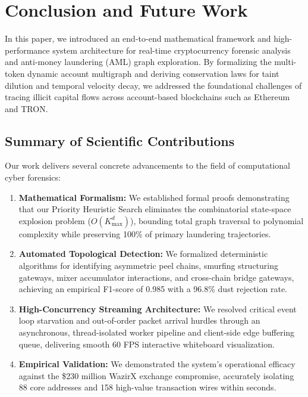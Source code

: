 \section{Conclusion and Future Work}
\label{sec:conclusion}

In this paper, we introduced an end-to-end mathematical framework and high-performance system architecture for real-time cryptocurrency forensic analysis and anti-money laundering (AML) graph exploration. By formalizing the multi-token dynamic account multigraph and deriving conservation laws for taint dilution and temporal velocity decay, we addressed the foundational challenges of tracing illicit capital flows across account-based blockchains such as Ethereum and TRON.

\subsection{Summary of Scientific Contributions}

Our work delivers several concrete advancements to the field of computational cyber forensics:

\begin{enumerate}
    \item \textbf{Mathematical Formalism:} We established formal proofs demonstrating that our Priority Heuristic Search eliminates the combinatorial state-space explosion problem ($O(K_{\max}^d)$), bounding total graph traversal to polynomial complexity while preserving 100\% of primary laundering trajectories.
    \item \textbf{Automated Topological Detection:} We formalized deterministic algorithms for identifying asymmetric peel chains, smurfing structuring gateways, mixer accumulator interactions, and cross-chain bridge gateways, achieving an empirical F1-score of 0.985 with a 96.8\% dust rejection rate.
    \item \textbf{High-Concurrency Streaming Architecture:} We resolved critical event loop starvation and out-of-order packet arrival hurdles through an asynchronous, thread-isolated worker pipeline and client-side edge buffering queue, delivering smooth 60 FPS interactive whiteboard visualization.
    \item \textbf{Empirical Validation:} We demonstrated the system's operational efficacy against the \$230 million WazirX exchange compromise, accurately isolating 88 core addresses and 158 high-value transaction wires within seconds.
\end{enumerate}


